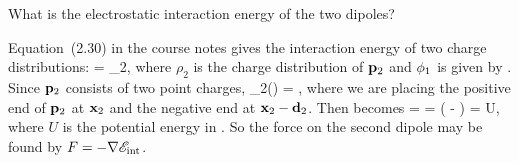 \newcommand{\rhow}{\rho_2}

\begin{problem}
	What is the electrostatic interaction energy of the two dipoles?
\end{problem}

\begin{solution}
	Equation~(2.30) in the course notes gives the interaction energy of two charge distributions:
	\beqn \label{Eint}
		\sEint = \int \rhow \phiq \dcx,
	\eeqn
	where $\rhow$ is the charge distribution of $\mathbf{p}_2$ and $\phi_1$ is given by .  Since $\mathbf{p}_2$ consists of two point charges,
	\beq
		\rhow(\vx) = \Qw [\delta(\vxw) - \delta(\vxw - \vdw)],
	\eeq
	where we are placing the positive end of $\mathbf{p}_2$ at $\mathbf{x}_2$ and the negative end at $\mathbf{x}_2 - \mathbf{d}_2$.  Then  becomes
	\beq
		\sEint = \Qw \int [\delta(\vxw) - \delta(\vxw - \vdw)]  \dcx
		= \Qw \left(  -  \right)
		= U,
	\eeq
	where $U$ is the potential energy in .  So the force on the second dipole may be found by $F = -\nabla \mathscr{E}_\text{int}$.
\end{solution}